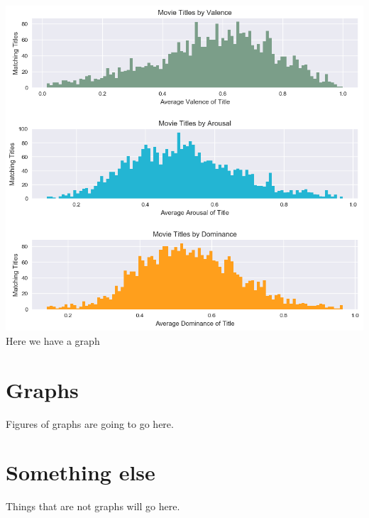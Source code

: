 \documentclass[12pt,a4paper]{article}
\begin{document}
    \centering
    \includegraphics[scale=0.8]{Movie_titles_by_vad}
    Here we have a graph

    \begin{appendices}
        \section{Graphs}
        Figures of graphs are going to go here.
        \section{Something else}
        Things that are not graphs will go here.
    \end{appendices}
\end{document}
